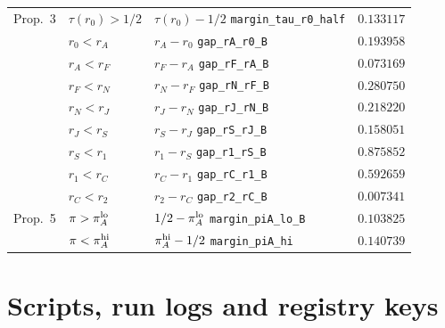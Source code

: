 \documentclass[11pt]{article}
\theoremstyle{definition}
\begin{document}
\begin{table}[h]
\begin{tabular}{@{}lllr@{}}
\midrule
Prop.~3 & $\tau(r_0)>1/2$ & $\tau(r_0)-1/2$ \hfill\texttt{margin\_tau\_r0\_half} & $0.133117$\\
 & $r_0<r_A$ & $r_A-r_0$ \hfill\texttt{gap\_rA\_r0\_B} & $0.193958$\\
 & $r_A<r_F$ & $r_F-r_A$ \hfill\texttt{gap\_rF\_rA\_B} & $0.073169$\\
 & $r_F<r_N$ & $r_N-r_F$ \hfill\texttt{gap\_rN\_rF\_B} & $0.280750$\\
 & $r_N<r_J$ & $r_J-r_N$ \hfill\texttt{gap\_rJ\_rN\_B} & $0.218220$\\
 & $r_J<r_S$ & $r_S-r_J$ \hfill\texttt{gap\_rS\_rJ\_B} & $0.158051$\\
 & $r_S<r_1$ & $r_1-r_S$ \hfill\texttt{gap\_r1\_rS\_B} & $0.875852$\\
 & $r_1<r_C$ & $r_C-r_1$ \hfill\texttt{gap\_rC\_r1\_B} & $0.592659$\\
 & $r_C<r_2$ & $r_2-r_C$ \hfill\texttt{gap\_r2\_rC\_B} & $0.007341$\\
Prop.~5 & $\pi>\pi_A^{\rm lo}$ & $1/2-\pi_A^{\rm lo}$ \hfill\texttt{margin\_piA\_lo\_B} & $0.103825$\\
 & $\pi<\pi_A^{\rm hi}$ & $\pi_A^{\rm hi}-1/2$ \hfill\texttt{margin\_piA\_hi} & $0.140739$\\
\bottomrule
\end{tabular}
\end{table}

\section{Scripts, run logs and registry keys}\label{sec:scripts}
\end{document}
